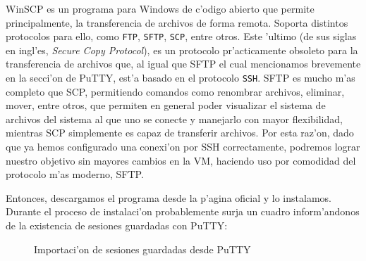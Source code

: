 \documentclass[11pt]{article}
\begin{document}
	WinSCP es un programa para Windows de c'odigo abierto que permite principalmente, la transferencia de archivos de forma remota. Soporta distintos protocolos para ello, como \texttt{FTP}, \texttt{SFTP}, \texttt{SCP}, entre otros. Este 'ultimo (de sus siglas en ingl'es, \textit{Secure Copy Protocol}), es un protocolo pr'acticamente obsoleto para la transferencia de archivos que, al igual que SFTP el cual mencionamos brevemente en la secci'on de PuTTY, est'a basado en el protocolo \texttt{SSH}. SFTP es mucho m'as completo que SCP, permitiendo comandos como renombrar archivos, eliminar, mover, entre otros, que permiten en general poder visualizar el sistema de archivos del sistema al que uno se conecte y manejarlo con mayor flexibilidad, mientras SCP simplemente es capaz de transferir archivos. Por esta raz'on, dado que ya hemos configurado una conexi'on por SSH correctamente, podremos lograr nuestro objetivo sin mayores cambios en la VM, haciendo uso por comodidad del protocolo m'as moderno, SFTP.
	
	Entonces, descargamos el programa desde la p'agina oficial y lo instalamos. Durante el proceso de instalaci'on probablemente surja un cuadro inform'andonos de la existencia de sesiones guardadas con PuTTY:
	
	\begin{figure}[H]
		\centering	\captionsetup{justification=centering}
		\hfill
		 \vspace{7pt}
		\caption{Importaci'on de sesiones guardadas desde PuTTY}
	\end{figure}
\end{document}
